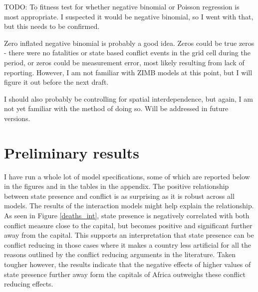 \documentclass[12pt]{article}
\begin{document}
TODO: To fitness test for whether negative binomial or Poisson regression is
most appropriate. I suspected it would be negative binomial, so I went with
that, but this needs to be confirmed.

Zero inflated negative binomial is probably a good idea. Zeros could be true
zeros - there were no fatalities or state based conflict events in the grid cell
during the period, or zeros could be measurement error, most likely resulting
from lack of reporting. However, I am not familiar with ZIMB models at this
point, but I will figure it out before the next draft.

I should also probably be controlling for spatial interdependence, but again, I
am not yet familiar with the method of doing so. Will be addressed in future
versions.

\section{Preliminary results}

I have run a whole lot of model specifications, some of which are reported below
in the figures and in the tables in the appendix. The positive relationship
between state presence and conflict is as surprising as it is robust across all
models. The results of the interaction models might help explain the
relationship. As seen in Figure \ref{deaths_int}, state
presence is negatively correlated with both conflict measure close to the
capital, but becomes positive and significant further away from the capital.
This supports an interpretation that state presence can be conflict reducing in
those cases where it makes a country less artificial for all the reasons
outlined by the conflict reducing arguments in the literature. Taken tougher
however, the results indicate that the negative effects of higher values of
state presence further away form the capitals of Africa outweighs these conflict
reducing effects. 


\end{document}

